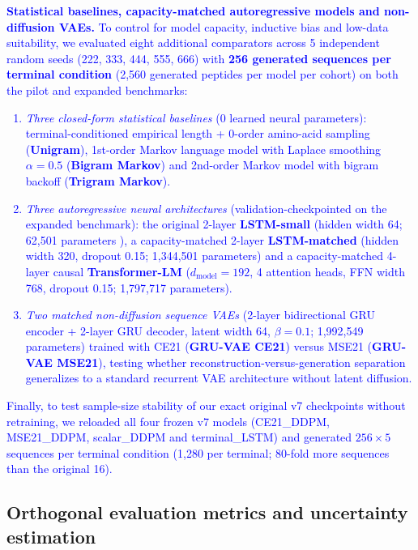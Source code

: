 \documentclass[unnumsec,webpdf,contemporary,large]{oup-authoring-template}
\newcommand{\rev}[1]{\textcolor{blue}{#1}}
\begin{document}
\rev{\textbf{Statistical baselines, capacity-matched autoregressive models and non-diffusion VAEs.} To control for model capacity, inductive bias and low-data suitability, we evaluated eight additional comparators across 5 independent random seeds (222, 333, 444, 555, 666) with \textbf{256 generated sequences per terminal condition} (2,560 generated peptides per model per cohort) on both the pilot and expanded benchmarks:
\begin{enumerate}
\item \textit{Three closed-form statistical baselines} (0 learned neural parameters): terminal-conditioned empirical length + 0-order amino-acid sampling (\textbf{Unigram}), 1st-order Markov language model with Laplace smoothing $\alpha=0.5$ (\textbf{Bigram Markov}) and 2nd-order Markov model with bigram backoff (\textbf{Trigram Markov}).
\item \textit{Three autoregressive neural architectures} (validation-checkpointed on the expanded benchmark): the original 2-layer \textbf{LSTM-small} (hidden width 64; 62,501 parameters \cite{refLSTM}), a capacity-matched 2-layer \textbf{LSTM-matched} (hidden width 320, dropout 0.15; 1,344,501 parameters) and a capacity-matched 4-layer causal \textbf{Transformer-LM} ($d_{\mathrm{model}}=192$, 4 attention heads, FFN width 768, dropout 0.15; 1,797,717 parameters).
\item \textit{Two matched non-diffusion sequence VAEs} (2-layer bidirectional GRU encoder + 2-layer GRU decoder, latent width 64, $\beta=0.1$; 1,992,549 parameters) trained with CE21 (\textbf{GRU-VAE CE21}) versus MSE21 (\textbf{GRU-VAE MSE21}), testing whether reconstruction-versus-generation separation generalizes to a standard recurrent VAE architecture without latent diffusion.
\end{enumerate}
Finally, to test sample-size stability of our exact original v7 checkpoints without retraining, we reloaded all four frozen v7 models (CE21\_DDPM, MSE21\_DDPM, scalar\_DDPM and terminal\_LSTM) and generated $256\times 5$ sequences per terminal condition (1,280 per terminal; 80-fold more sequences than the original 16).}

\subsection{Orthogonal evaluation metrics and uncertainty estimation}
\end{document}
